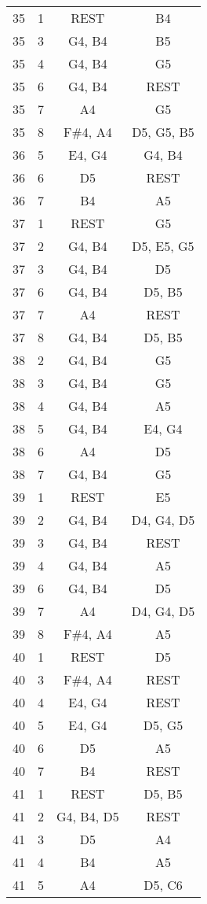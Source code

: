 \documentclass{article}
\begin{document}
\begin{longtable}{|c|c|c|c|}
\hline
35 & 1 & REST & B4 \\ 
35 & 3 & G4, B4 & B5 \\ 
35 & 4 & G4, B4 & G5 \\ 
35 & 6 & G4, B4 & REST \\ 
35 & 7 & A4 & G5 \\ 
35 & 8 & F\#4, A4 & D5, G5, B5 \\ 
\hline
36 & 5 & E4, G4 & G4, B4 \\ 
36 & 6 & D5 & REST \\ 
36 & 7 & B4 & A5 \\ 
\hline
37 & 1 & REST & G5 \\ 
37 & 2 & G4, B4 & D5, E5, G5 \\ 
37 & 3 & G4, B4 & D5 \\ 
37 & 6 & G4, B4 & D5, B5 \\ 
37 & 7 & A4 & REST \\ 
37 & 8 & G4, B4 & D5, B5 \\ 
\hline
38 & 2 & G4, B4 & G5 \\ 
38 & 3 & G4, B4 & G5 \\ 
38 & 4 & G4, B4 & A5 \\ 
38 & 5 & G4, B4 & E4, G4 \\ 
38 & 6 & A4 & D5 \\ 
38 & 7 & G4, B4 & G5 \\ 
\hline
39 & 1 & REST & E5 \\ 
39 & 2 & G4, B4 & D4, G4, D5 \\ 
39 & 3 & G4, B4 & REST \\ 
39 & 4 & G4, B4 & A5 \\ 
39 & 6 & G4, B4 & D5 \\ 
39 & 7 & A4 & D4, G4, D5 \\ 
39 & 8 & F\#4, A4 & A5 \\ 
\hline
40 & 1 & REST & D5 \\ 
40 & 3 & F\#4, A4 & REST \\ 
40 & 4 & E4, G4 & REST \\ 
40 & 5 & E4, G4 & D5, G5 \\ 
40 & 6 & D5 & A5 \\ 
40 & 7 & B4 & REST \\ 
\hline
41 & 1 & REST & D5, B5 \\ 
41 & 2 & G4, B4, D5 & REST \\ 
41 & 3 & D5 & A4 \\ 
41 & 4 & B4 & A5 \\ 
41 & 5 & A4 & D5, C6 \\ 

\end{longtable}
\end{document}
